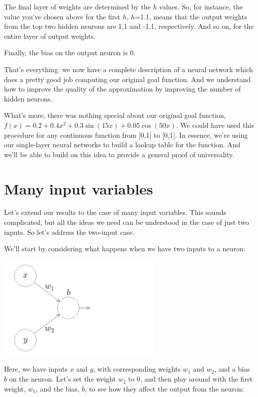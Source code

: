 The final layer of weights are determined by the $h$ values. So, for instance, the value you've chosen above for the first $h$, $h$=1.1, means that the output weights from the top two hidden neurons are 1.1 and -1.1, respectively. And so on, for the entire layer of output weights.

Finally, the bias on the output neuron is 0.

That's everything: we now have a complete description of a neural network which does a pretty good job computing our original goal function. And we understand how to improve the quality of the approximation by improving the number of hidden neurons.

What's more, there was nothing special about our original goal function, $f(x)=0.2+0.4x^2+0.3\sin(15x)+0.05\cos(50x)$. We could have used this procedure for any continuous function from [0,1] to [0,1]. In essence, we're using our single-layer neural networks to build a lookup table for the function. And we'll be able to build on this idea to provide a general proof of universality.

\section{Many input variables}
Let's extend our results to the case of many input variables. This sounds complicated, but all the ideas we need can be understood in the case of just two inputs. So let's address the two-input case.

We'll start by considering what happens when we have two inputs to a neuron:

{\centering \includegraphics[width=0.6\textwidth,]{pic/wigglyfn20} \par}

Here, we have inputs $x$ and $y$, with corresponding weights $w_1$ and $w_2$, and a bias $b$ on the neuron. Let's set the weight $w_2$ to 0, and then play around with the first weight, $w_1$, and the bias, $b$, to see how they affect the output from the neuron:


